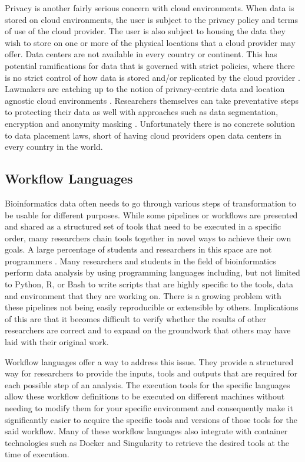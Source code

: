 Privacy is another fairly serious concern with cloud environments. When data is stored on cloud environments, the user is subject to the privacy policy and terms of use of the cloud provider. The user is also subject to housing the data they wish to store on one or more of the physical locations that a cloud provider may offer. Data centers are not available in every country or continent. This has potential ramifications for data that is governed with strict policies, where there is no strict control of how data is stored and/or replicated by the cloud provider \parencite{abouelmehdi2017big}. Lawmakers are catching up to the notion of privacy-centric data and location agnostic cloud environments \parencite{gholami2016big}. Researchers themselves can take preventative steps to protecting their data as well with approaches such as data segmentation, encryption and anonymity masking \parencite{sun2014data}. Unfortunately there is no concrete solution to data placement laws, short of having cloud providers open data centers in every country in the world.



\subsection{Workflow Languages}

Bioinformatics data often needs to go through various steps of transformation to be usable for different purposes. While some pipelines or workflows are presented and shared as a structured set of tools that need to be executed in a specific order, many researchers chain tools together in novel ways to achieve their own goals. A large percentage of students and researchers in this space are not programmers \parencite{mesirov2010accessible}. Many researchers and students in the field of bioinformatics perform data analysis by using programming languages including, but not limited to Python, R, or Bash to write scripts that are highly specific to the tools, data and environment that they are working on. There is a growing problem with these pipelines not being easily reproducible or extensible by others. Implications of this are that it becomes difficult to verify whether the results of other researchers are correct and to expand on the groundwork that others may have laid with their original work.

Workflow languages offer a way to address this issue. They provide a structured way for researchers to provide the inputs, tools and outputs that are required for each possible step of an analysis. The execution tools for the specific languages allow these workflow definitions to be executed on different machines without needing to modify them for your specific environment and consequently make it significantly easier to acquire the specific tools and versions of those tools for the said workflow. Many of these workflow languages also integrate with container technologies such as Docker and Singularity to retrieve the desired tools at the time of execution.

